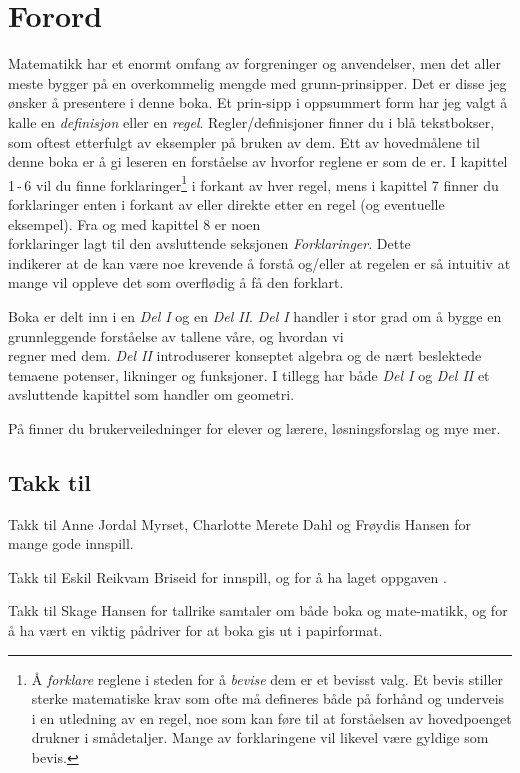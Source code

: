 




\section*{Forord}
Matematikk har et enormt omfang av forgreninger og anvendelser, men det aller meste bygger på en overkommelig mengde med grunn-prinsipper. Det er disse jeg ønsker å presentere i denne boka. Et prin-sipp i oppsummert form har jeg valgt å kalle en \textit{definisjon} eller en \textit{regel}. Regler/definisjoner finner du i blå tekstbokser, som oftest etterfulgt av eksempler på bruken av dem. Ett av hovedmålene til denne boka er å gi leseren en forståelse av hvorfor reglene er som de er. I kapittel 1\,-\,6 vil du finne forklaringer\footnote{Å \textsl{forklare} reglene i steden for å \textsl{bevise} dem er et bevisst valg. Et bevis stiller sterke matematiske krav som ofte må defineres både på forhånd og underveis i en utledning av en regel, noe som kan føre til at forståelsen av hovedpoenget drukner i smådetaljer. Mange av forklaringene vil likevel være gyldige som bevis.} i forkant av hver regel, mens i kapittel 7 finner du forklaringer enten i forkant av eller direkte etter en regel (og eventuelle eksempel). Fra og med kapittel 8 er noen \\ forklaringer lagt til den avsluttende seksjonen \textit{Forklaringer}. Dette \\ indikerer at de kan være noe krevende å forstå og/eller at regelen er så intuitiv at mange vil oppleve det som overflødig å få den forklart. \vsk

Boka er delt inn i en \textsl{Del I} og en \textsl{Del II}. \textsl{Del I} handler i stor grad om å bygge en grunnleggende forståelse av tallene våre, og hvordan vi\\ regner med dem. \textsl{Del II} introduserer konseptet algebra og de nært beslektede temaene potenser, likninger og funksjoner. I tillegg har både \textsl{Del I} og \textsl{Del II} et avsluttende kapittel som handler om geometri. \vsk

På  finner du brukerveiledninger for elever og lærere, løsningsforslag og mye mer.\vsk \vsk


\subsection*{Takk til}
Takk til
Anne Jordal Myrset,
Charlotte Merete Dahl og
Frøydis Hansen for mange gode innspill. \vsk

Takk til Eskil Reikvam Briseid for innspill, og for å ha laget oppgaven . \vsk

Takk til Skage Hansen 
for tallrike samtaler om både boka og mate-matikk, og for å ha vært en viktig pådriver for at boka gis ut i papirformat.


